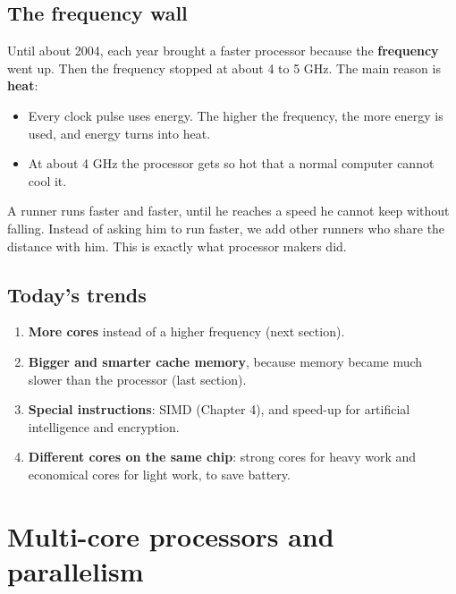 \subsection{The frequency wall}
Until about 2004, each year brought a faster processor because the \textbf{frequency} went up. Then the frequency
stopped at about 4 to 5 GHz. The main reason is \textbf{heat}:
\begin{itemize}
    \item Every clock pulse uses energy. The higher the frequency, the more energy is used, and energy turns into heat.
    \item At about 4 GHz the processor gets so hot that a normal computer cannot cool it.
\end{itemize}

\begin{tashbih}
    A runner runs faster and faster, until he reaches a speed he cannot keep without falling. Instead of asking him to
    run faster, we add other runners who share the distance with him. This is exactly what processor makers did.
\end{tashbih}

\subsection{Today's trends}
\begin{enumerate}
    \item \textbf{More cores} instead of a higher frequency (next section).
    \item \textbf{Bigger and smarter cache memory}, because memory became much slower than the processor (last section).
    \item \textbf{Special instructions}: SIMD (Chapter 4), and speed-up for artificial intelligence and encryption.
    \item \textbf{Different cores on the same chip}: strong cores for heavy work and economical cores for light work, to save battery.
\end{enumerate}

\section{Multi-core processors and parallelism}


